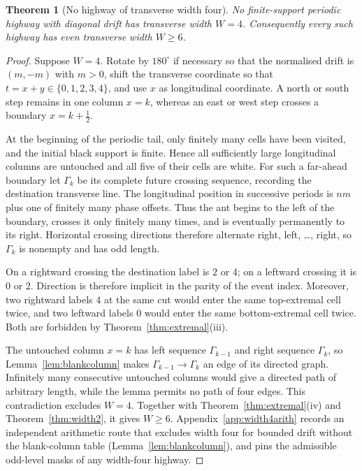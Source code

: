 \documentclass[11pt,letterpaper]{article}
\theoremstyle{plain}
\newtheorem{theorem}{Theorem}[section]
\theoremstyle{definition}
\begin{document}
\begin{NoHyper}
\begin{theorem}[No highway of transverse width four]\label{thm:width4}
No finite-support periodic highway with diagonal drift has transverse width $W=4$.
Consequently every such highway has even transverse width $W\ge6$.
\end{theorem}

\begin{proof}
Suppose $W=4$.  Rotate by $180^\circ$ if necessary so that the normalised drift is
$(m,-m)$ with $m>0$, shift the transverse coordinate so that
$t=x+y\in\{0,1,2,3,4\}$, and use $x$ as longitudinal coordinate.  A north or south
step remains in one column $x=k$, whereas an east or west step crosses a boundary
$x=k+\tfrac12$.

At the beginning of the periodic tail, only finitely many cells have been visited,
and the initial black support is finite.  Hence all sufficiently large longitudinal
columns are untouched and all five of their cells are white.  For such a far-ahead
boundary let $\Gamma_k$ be its complete future crossing sequence, recording the
destination transverse line.  The longitudinal position in successive periods is
$nm$ plus one of finitely many phase offsets.  Thus the ant begins to the left of the
boundary, crosses it only finitely many times, and is eventually permanently to its
right.  Horizontal crossing directions therefore alternate right, left, \ldots,
right, so $\Gamma_k$ is nonempty and has odd length.

On a rightward crossing the destination label is $2$ or $4$; on a leftward crossing
it is $0$ or $2$.  Direction is therefore implicit in the parity of the event index.
Moreover, two rightward labels $4$ at the same cut would enter the same top-extremal
cell twice, and two leftward labels $0$ would enter the same bottom-extremal cell
twice.  Both are forbidden by Theorem~\ref{thm:extremal}(iii).

The untouched column $x=k$ has left sequence $\Gamma_{k-1}$ and right sequence
$\Gamma_k$, so Lemma~\ref{lem:blankcolumn} makes
$\Gamma_{k-1}\to\Gamma_k$ an edge of its directed graph.  Infinitely many
consecutive untouched columns would give a directed path of arbitrary length, while
the lemma permits no path of four edges.  This contradiction excludes $W=4$.
Together with Theorem~\ref{thm:extremal}(iv) and Theorem~\ref{thm:width2}, it gives
$W\ge6$. Appendix~\ref{app:width4arith} records an independent arithmetic route that
excludes width four for bounded drift without the blank-column table
(Lemma~\ref{lem:blankcolumn}), and pins the admissible odd-level masks of any
width-four highway.
\end{proof}


\end{NoHyper}
\end{document}
